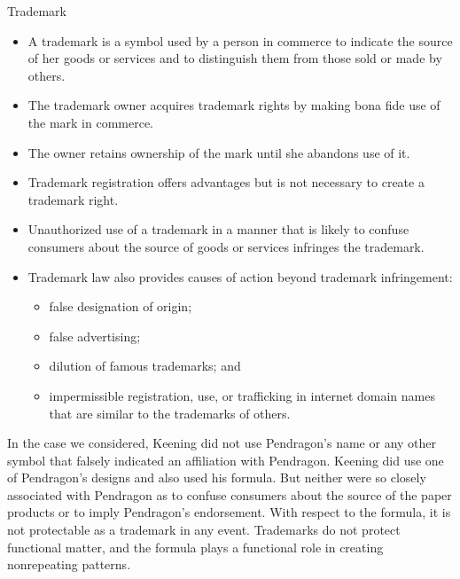 \documentclass[ignorenonframetext,aspectratio=169]{beamer}
\providecommand{\tightlist}{%
  \setlength{\itemsep}{0pt}\setlength{\parskip}{0pt}}
\begin{document}
\begin{frame}{Trademark}
\protect\hypertarget{trademark-1}{}

\begin{itemize}
\tightlist
\item
  A trademark is a symbol used by a person in commerce to indicate the
  source of her goods or services and to distinguish them from those
  sold or made by others.
\item
  The trademark owner acquires trademark rights by making bona fide use
  of the mark in commerce.
\item
  The owner retains ownership of the mark until she abandons use of it.
\item
  Trademark registration offers advantages but is not necessary to
  create a trademark right.
\item
  Unauthorized use of a trademark in a manner that is likely to confuse
  consumers about the source of goods or services infringes the
  trademark.
\item
  Trademark law also provides causes of action beyond trademark
  infringement:

  \begin{itemize}
  \tightlist
  \item
    false designation of origin;
  \item
    false advertising;
  \item
    dilution of famous trademarks; and
  \item
    impermissible registration, use, or trafficking in internet domain
    names that are similar to the trademarks of others.
  \end{itemize}
\end{itemize}

\end{frame}

\begin{frame}{}
\protect\hypertarget{section-13}{}

In the case we considered, Keening did not use Pendragon's name or any
other symbol that falsely indicated an affiliation with Pendragon.
Keening did use one of Pendragon's designs and also used his formula.
But neither were so closely associated with Pendragon as to confuse
consumers about the source of the paper products or to imply Pendragon's
endorsement. With respect to the formula, it is not protectable as a
trademark in any event. Trademarks do not protect functional matter, and
the formula plays a functional role in creating nonrepeating patterns.

\end{frame}
\end{document}
